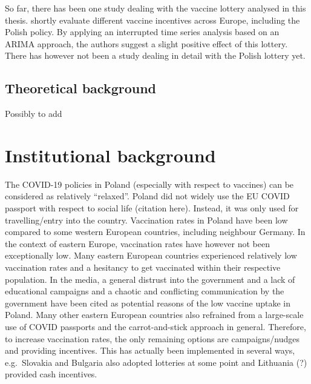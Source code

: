 \documentclass{scrbook}
\begin{document}
So far, there has been one study dealing with the vaccine lottery
analysed in this thesis. \textcite{kuznetsova_effectiveness_2022}
shortly evaluate different vaccine incentives across Europe, including
the Polish policy. By applying an interrupted time series analysis based
on an ARIMA approach, the authors suggest a slight positive effect of
this lottery. There has however not been a study dealing in detail with
the Polish lottery yet.

\subsection{Theoretical background}

Possibly to add

\section{Institutional background}

The COVID-19 policies in Poland (especially with respect to vaccines)
can be considered as relatively ``relaxed''. Poland did not widely use
the EU COVID passport with respect to social life (citation here).
Instead, it was only used for travelling/entry into the country.
Vaccination rates in Poland have been low compared to some western
European countries, including neighbour Germany. In the context of
eastern Europe, vaccination rates have however not been exceptionally
low. Many eastern European countries experienced relatively low
vaccination rates and a hesitancy to get vaccinated within their
respective population. In the media, a general distrust into the
government and a lack of educational campaigns
\parencite{noauthor_polands_2021} and a chaotic and conflicting
communication by the government \parencite{wanat_polands_2021} have been
cited as potential reasons of the low vaccine uptake in Poland. Many
other eastern European countries also refrained from a large-scale use
of COVID passports and the carrot-and-stick approach in general.
Therefore, to increase vaccination rates, the only remaining options are
campaigns/nudges and providing incentives. This has actually been
implemented in several ways, e.g.~Slovakia and Bulgaria also adopted
lotteries at some point and Lithuania (?) provided cash incentives.
\end{document}
